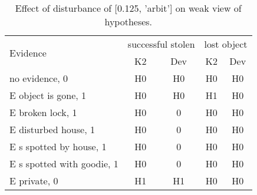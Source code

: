 \begin{table}\begin{tabular}{l|cc|cc}\toprule\multirow{2}{*}{Evidence} & \multicolumn{2}{c}{successful stolen}& \multicolumn{2}{c}{lost object}\\& {K2} & {Dev}& {K2} & {Dev}\\\midrule
no evidence, 0 & H0&H0&H0&H0\\E object is gone, 1 & H0&H0&\cellcolor{Bittersweet}H1&\cellcolor{Bittersweet}H0\\E broken lock, 1 & \cellcolor{Bittersweet}H0&\cellcolor{Bittersweet}0&H0&H0\\E disturbed house, 1 & \cellcolor{Bittersweet}H0&\cellcolor{Bittersweet}0&H0&H0\\E s spotted by house, 1 & \cellcolor{Bittersweet}H0&\cellcolor{Bittersweet}0&H0&H0\\E s spotted with goodie, 1 & \cellcolor{Bittersweet}H0&\cellcolor{Bittersweet}0&H0&H0\\E private, 0 & H1&H1&H0&H0\\\bottomrule\end{tabular}\caption{Effect of disturbance of [0.125, 'arbit'] on weak view of hypotheses.}\end{table}